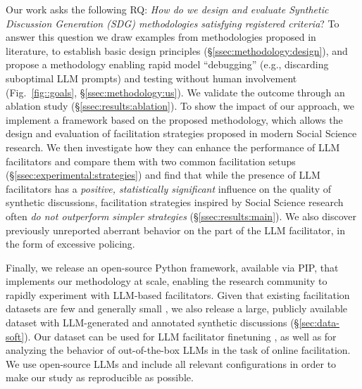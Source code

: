 Our work asks the following RQ: \emph{How do we design and evaluate Synthetic Discussion Generation (SDG) methodologies satisfying registered criteria}? To answer this question we draw examples from methodologies proposed in literature, to establish basic design principles (\S\ref{ssec:methodology:design}), and propose a methodology enabling rapid model ``debugging'' (e.g., discarding suboptimal LLM prompts) and testing without human involvement (Fig.~\ref{fig::goals}, \S\ref{ssec:methodology:us}). We validate the outcome through an ablation study (\S\ref{ssec:results:ablation}). To show the impact of our approach, we implement a framework based on the proposed methodology, which allows the design and evaluation of facilitation strategies proposed in modern Social Science research. We then investigate how they can enhance the performance of LLM facilitators and compare them with two common facilitation setups (\S\ref{ssec:experimental:strategies}) and find that while the presence of LLM facilitators has a \emph{positive, statistically significant} influence on the quality of synthetic discussions, facilitation strategies inspired by Social Science research often \emph{do not outperform simpler strategies} (\S\ref{ssec:results:main}). We also discover previously unreported aberrant behavior on the part of the LLM facilitator, in the form of excessive policing.

Finally, we release an open-source Python framework, available via PIP, that implements our methodology at scale, enabling the research community to rapidly experiment with LLM-based facilitators. Given that existing facilitation datasets are few and generally small \citep{korre2025evaluation}, we also release \vmd a large, publicly available dataset with LLM-generated and annotated synthetic discussions (\S\ref{sec:data-soft}). Our dataset can be used for LLM facilitator finetuning \cite{ulmer2024}, as well as for analyzing the behavior of out-of-the-box LLMs in the task of online facilitation. We use open-source LLMs and include all relevant configurations in order to make our study as reproducible as possible.
